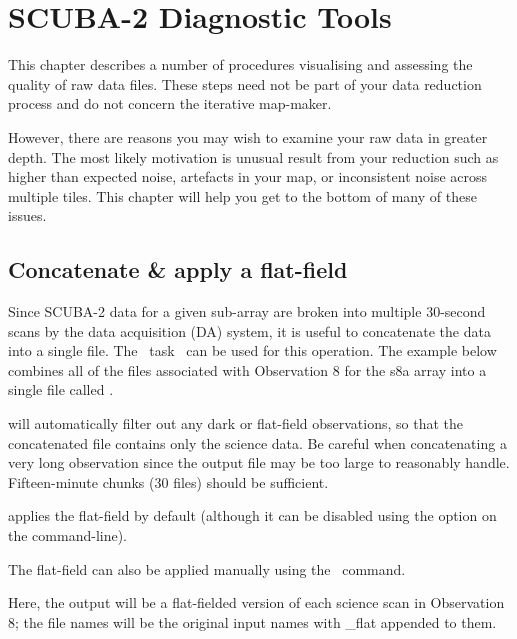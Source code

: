 \chapter{SCUBA-2 Diagnostic Tools}
\label{sec:raw}

This chapter describes a number of procedures visualising and
assessing the quality of raw data files.  These steps need not be part
of your data reduction process and do not concern the iterative
map-maker.

However, there are reasons you may wish to examine your raw data in
greater depth. The most likely motivation is unusual result from  your
reduction such as higher than expected noise, artefacts in your map,
or inconsistent noise across multiple tiles.  This chapter will help
you get to the bottom of many of these issues.


\section{Concatenate \& apply a flat-field}
\label{sec:concat}

Since SCUBA-2 data for a given sub-array are broken into multiple
30-second scans by the data acquisition (DA) system, it is useful to
concatenate the data into a single file. The \smurf\ task \concat\ can
be used for this operation. The example below combines all of the
files associated with Observation 8 for the s8a array into a single
file called .

\begin{terminalv}
\end{terminalv}

 will automatically filter out any dark or flat-field
observations, so that the concatenated file contains only the science
data. Be careful when concatenating a very long observation since the
output file may be too large to reasonably handle. Fifteen-minute
chunks (30 files) should be sufficient.

 applies the flat-field by default (although it can be
disabled using the  option on the command-line).

The flat-field can also be applied manually using the \flatfield\
command.

\begin{terminalv}
\end{terminalv}
Here, the output will be a flat-fielded version of each science scan
in Observation 8; the file names will be the original input
names with \_flat appended to them.

